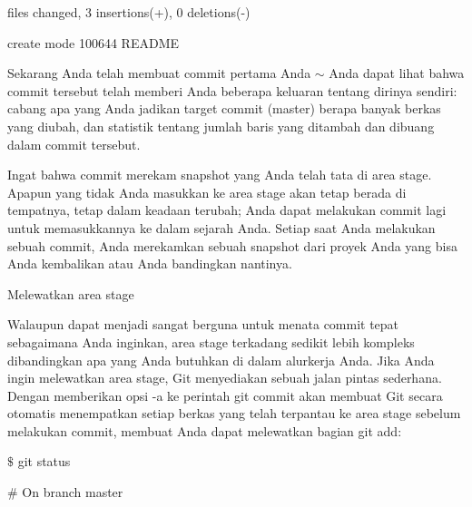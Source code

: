 \noindent 
{\fontsize{14pt}{14pt} files changed, 3 insertions(+), 0 deletions(-) \\} \par
\noindent 
{\fontsize{14pt}{14pt}\selectfont create mode 100644 README \\} \par
\vspace{14pt}
\noindent 
{\fontsize{14pt}{14pt}\selectfont Sekarang Anda telah membuat commit pertama Anda $  \sim  $ Anda dapat lihat bahwa commit tersebut telah memberi Anda beberapa keluaran tentang dirinya sendiri: cabang apa yang Anda jadikan target commit (master) berapa banyak berkas yang diubah, dan statistik tentang jumlah baris yang ditambah dan dibuang dalam commit tersebut. \\} \par
\noindent 
{\fontsize{14pt}{14pt}\selectfont Ingat bahwa commit merekam snapshot yang Anda telah tata di area stage. Apapun yang tidak Anda masukkan ke area stage akan tetap berada di tempatnya, tetap dalam keadaan terubah; Anda dapat melakukan commit lagi untuk memasukkannya ke dalam sejarah Anda. Setiap saat Anda melakukan sebuah commit, Anda merekamkan sebuah snapshot dari proyek Anda yang bisa Anda kembalikan atau Anda bandingkan nantinya. \\} \par
\vspace{14pt}
\noindent 
{\fontsize{14pt}{14pt}\selectfont Melewatkan area stage \\} \par
\noindent 
{\fontsize{14pt}{14pt}\selectfont Walaupun dapat menjadi sangat berguna untuk menata commit tepat sebagaimana Anda inginkan, area stage terkadang sedikit lebih kompleks dibandingkan apa yang Anda butuhkan di dalam alurkerja Anda. Jika Anda ingin melewatkan area stage, Git menyediakan sebuah jalan pintas sederhana. Dengan memberikan opsi $  $-a $  $ke perintah $  $git commit $  $akan membuat Git secara otomatis menempatkan setiap berkas yang telah terpantau ke area stage sebelum melakukan commit, membuat Anda dapat melewatkan bagian $  $git add: \\} \par
\vspace{14pt}
\noindent 
{\fontsize{14pt}{14pt}\selectfont  $  \$  $ git status \\} \par
\noindent 
{\fontsize{14pt}{14pt}\selectfont  $  \#  $ On branch master \\} \par
